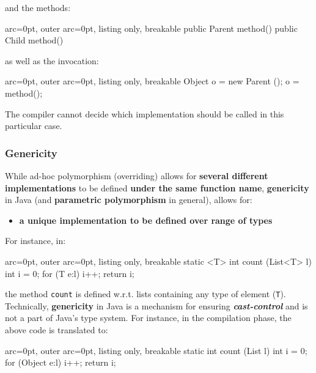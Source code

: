 and the methods:


\begin{tcblisting}{ arc=0pt, outer arc=0pt, listing only, breakable}
public Parent method() {}
public Child method() {}

\end{tcblisting}


as well as the invocation:


\begin{tcblisting}{ arc=0pt, outer arc=0pt, listing only, breakable}
Object o = new Parent ();
o = method();

\end{tcblisting}


The compiler cannot decide which implementation should be called in this particular case.

\subsubsection*{ Genericity }

While ad-hoc polymorphism (overriding) allows for \textbf{several different implementations} to be defined \textbf{under the same function name}, \textbf{genericity} in Java (and \textbf{parametric polymorphism} in general), allows for:
\begin{itemize}
	\item  \textbf{a unique implementation to be defined over range of types}
\end{itemize}

For instance, in:

\begin{tcblisting}{ arc=0pt, outer arc=0pt, listing only, breakable}
static <T> int count (List<T> l){
    int i = 0;
    for (T e:l)
        i++;
    return i;
}

\end{tcblisting}


the method \texttt{count} is defined w.r.t. lists containing any type of element (\texttt{T}). Technically, \textbf{genericity} in Java is a mechanism for ensuring \textit{\textbf{cast-control}} and is not a part of Java's type system. For instance, in the compilation phase, the above code is translated to:


\begin{tcblisting}{ arc=0pt, outer arc=0pt, listing only, breakable}
static int count (List l){
    int i = 0;
    for (Object e:l)
        i++;
    return i;
}

\end{tcblisting}


